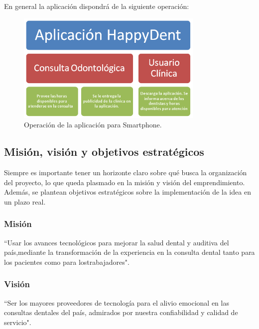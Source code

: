 \documentclass[letterpaper,12pt]{article}
\begin{document}
\indent En general la aplicación dispondrá de la siguiente operación:

	\begin{figure}[h!]
		\begin{center}
			\includegraphics[width=0.8\textwidth]{op_aplicacion_cel}
			\caption{Operación de la aplicación para Smartphone.}
			\label{smatphone}
		\end{center}
	\end{figure}
	\newpage
	\subsection{Misión, visión y objetivos estratégicos}

Siempre es importante tener un horizonte claro sobre qué busca la organización del proyecto,
lo que queda plasmado en la misión y visión del emprendimiento. Además, se plantean objetivos 
estratégicos sobre la implementación de la idea en un plazo real.
		\subsubsection{Misión}
		
			\begin{center}
				{\color{blue} ``Usar los avances tecnológicos para mejorar la salud dental y auditiva del país,mediante la transformación de la experiencia en la consulta dental tanto para los pacientes como para lostrabajadores".}
			\end{center}

		\subsubsection{Visión}
				\begin{center}
				{\color{blue} ``Ser los mayores proveedores de tecnología para el alivio emocional en las consultas dentales del país, admirados por nuestra confiabilidad y calidad de servicio".}
			\end{center}
\end{document}
